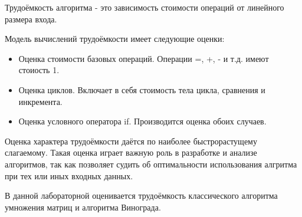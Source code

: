 Трудоёмкость алгоритма - это зависимость стоимости операций от линейного размера входа\cite{perf_def}.

Модель вычислений трудоёмкости имеет следующие оценки:
\begin{itemize}
	\item Оценка стоимости базовых операций. Операции =, +, - и т.д. имеют стоиость 1.
	\item Оценка циклов. Включает в себя стоимость тела цикла, сравнения и инкремента.
	\item Оценка условного оператора if. Производится оценка обоих случаев.
\end{itemize}

Оценка характера трудоёмкости даётся по наиболее быстрорастущему слагаемому. Такая оценка играет важную роль в 
разработке и анализе алгоритмов, так как позволяет судить об оптимальности использования алгритма при тех или
иных входных данных.

В данной лабораторной оценивается трудоёмкость классического алгоритма умножения матриц и алгоритма Винограда. 
